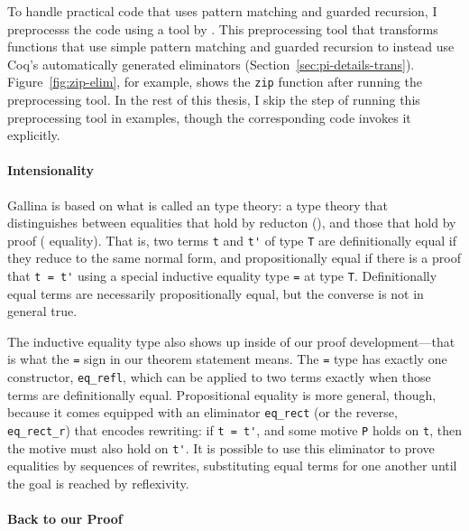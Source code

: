 To handle practical code that uses pattern matching and guarded recursion,
I preprocesss the code using a tool by .
This preprocessing tool that transforms functions that use simple pattern matching and guarded recursion
to instead use Coq's automatically generated eliminators (Section~\ref{sec:pi-details-trans}).
Figure~\ref{fig:zip-elim}, for example, shows the \lstinline{zip} function after running the preprocessing tool.
In the rest of this thesis, I skip the step of running this preprocessing tool in examples,
though the corresponding code invokes it explicitly.

\paragraph{Intensionality}

Gallina is based on what is called an  type theory:
a type theory that distinguishes between equalities that hold by reducton (), and those that hold by proof ( equality).
That is, two terms \lstinline{t} and \lstinline{t'} of type \lstinline{T} are definitionally equal if they reduce to the same normal form,
and propositionally equal if there is a proof that \lstinline{t = t'} using a special inductive
equality type \lstinline{=} at type \lstinline{T}. Definitionally equal terms are necessarily propositionally equal, but 
the converse is not in general true. %

The inductive equality type also shows up inside of our proof development---that is what the \lstinline{=} sign in our theorem statement means.
The \lstinline{=} type has exactly one constructor, \lstinline{eq_refl}, which can be applied to two terms exactly when those terms are definitionally equal.
Propositional equality is more general, though, because it comes equipped with an eliminator \lstinline{eq_rect} (or the reverse, \lstinline{eq_rect_r})
that encodes rewriting: if \lstinline{t = t'}, and some motive \lstinline{P} holds on \lstinline{t}, then the motive must also hold on \lstinline{t'}.
It is possible to use this eliminator to prove equalities by sequences of rewrites, substituting equal terms for one another until the goal is reached by reflexivity.

\paragraph{Back to our Proof}


